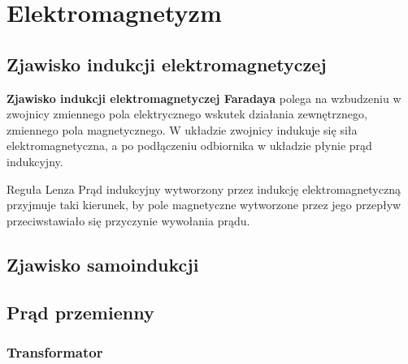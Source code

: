 \chapter{Elektromagnetyzm}
  \section{Zjawisko indukcji elektromagnetyczej}

    \begin{definition}
      \textbf{Zjawisko indukcji elektromagnetyczej Faradaya} polega na wzbudzeniu w zwojnicy zmiennego pola elektrycznego wskutek działania zewnętrznego, zmiennego pola magnetycznego. W układzie zwojnicy indukuje się siła elektromagnetyczna, a po podłączeniu odbiornika w układzie płynie prąd indukcyjny.
    \end{definition}

    \begin{law}{Reguła Lenza}
      Prąd indukcyjny wytworzony przez indukcję elektromagnetyczną przyjmuje taki kierunek, by pole magnetyczne wytworzone przez jego przepływ przeciwstawiało się przyczynie wywołania prądu.
    \end{law}

  \section{Zjawisko samoindukcji}

  \section{Prąd przemienny}
    \subsection{Transformator}
